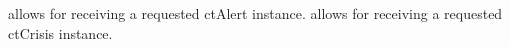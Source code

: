 \begin{actortable}
							 {allows for receiving a requested ctAlert instance.}
							 {allows for receiving a requested ctCrisis instance.}
	
\end{actortable}
